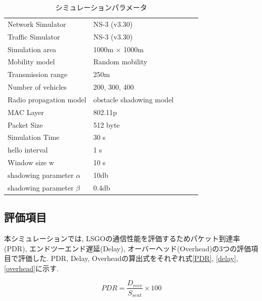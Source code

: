 \documentclass[10pt]{jreport}
\begin{document}
\begin{table}[!ht]
	\begin{center}
		\caption{シミュレーションパラメータ}
		\label{tab:parameter}
		\begin{tabular}{|l|l|lll}
			\cline{1-2}
			Network Simulator    & NS-3 (v3.30) &  &  &  \\ \cline{1-2}
			Traffic Simulator    & NS-3 (v3.30) &  &  &  \\ \cline{1-2}
			Simulation area    & 1000m × 1000m   &  &  &  \\ \cline{1-2}
			Mobility model     & Random mobility &  &  &  \\ \cline{1-2}
			Transmission range & 250m            &  &  &  \\ \cline{1-2}
			Number of vehicles & 200, 300, 400      &  &  &  \\ \cline{1-2}
			Radio propagation model    & obstacle shadowing model\cite{20}&  &  &  \\ \cline{1-2}
			MAC Layer     & 802.11p &  &  &  \\ \cline{1-2}
			Packet Size & 512 byte       &  &  &  \\ \cline{1-2}
			Simulation Time & 30 s      &  &  &  \\ \cline{1-2}
			hello interval & 1 s      &  &  &  \\ \cline{1-2}
			Window size w  & 10 s      &  &  &  \\ \cline{1-2}
			shadowing parameter $\alpha$  & 10db      &  &  &  \\ \cline{1-2}
			shadowing parameter $\beta$    & 0.4db &  &  \\ \cline{1-2}
		\end{tabular}
	\end{center}
\end{table}

\subsection{評価項目}
本シミュレーションでは, LSGOの通信性能を評価するためパケット到達率(PDR), エンドツーエンド遅延(Delay), オーバーヘッド(Overhead)の3つの評価項目で評価した. PDR, Delay, Overheadの算出式をそれぞれ式\ref{PDR}, \ref{delay}, \ref{overhead}に示す.

\begin{equation}
	\label{PDR}
	PDR = \frac{D_{recv}}{  S_{sent}  } \times 100
\end{equation}
\end{document}
